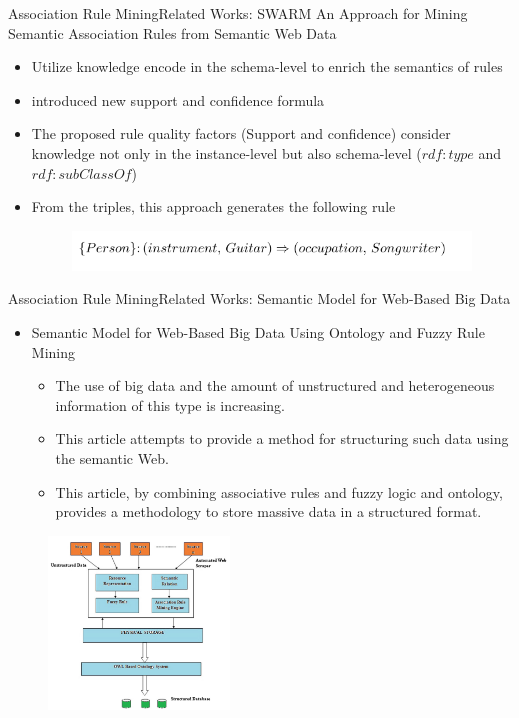 \documentclass[10pt]{beamer}
\begin{document}
\begin{frame}{Association Rule Mining}{Related Works:  SWARM}
An Approach for Mining Semantic Association Rules from Semantic Web Data \cite{barati2016swarm}
\begin{itemize}
\item Utilize knowledge encode in the schema-level to enrich the semantics of rules
\item introduced new support and confidence formula
\item The proposed rule quality factors (Support and confidence) consider knowledge not only in the instance-level but also schema-level ($rdf:type$ and $rdf:subClassOf$)
\item From the triples, this approach generates the following rule
\begin{figure} 
\centering
\includegraphics[width=1\linewidth]{images/swarm-example.PNG}

\end{figure}
\end{itemize}
\end{frame}

\begin{frame}{Association Rule Mining}{Related Works: Semantic Model for Web-Based Big Data}
\begin{itemize}
\item Semantic Model for Web-Based Big Data Using Ontology and Fuzzy Rule Mining \cite{das2016semantic}
\begin{itemize}
\item The use of big data and the amount of unstructured and heterogeneous information of this type is increasing.
\item  This article attempts to provide a method for structuring such data using the semantic Web.
\item This article, by combining associative rules and fuzzy logic and ontology, provides a methodology to store massive data in a structured format.
\end{itemize}
\end{itemize}
\begin{figure}[H]
	\centering
	\includegraphics[width=0.43\textwidth]{images/Methodology.PNG}
	\label{fig:Methodology}
\end{figure}
\end{frame}
\end{document}
